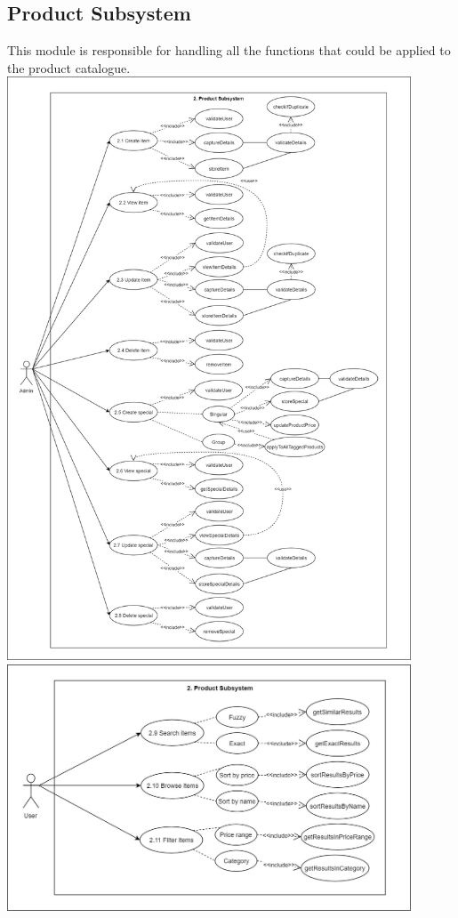 \documentclass[a4paper,10pt]{article}
\begin{document}
\subsection{Product Subsystem}
This module is responsible for handling all the functions that could be applied to the product catalogue.
\includegraphics[width=12cm]{Product_Subsystem_Use_Case.jpg}
\includegraphics[width=12cm]{Product_Subsystem_Use_Case_2.jpg}
\end{document}
